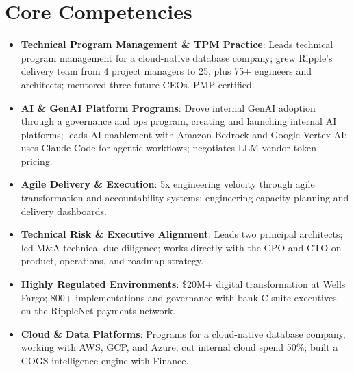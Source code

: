 \documentclass[11pt,letterpaper,sans]{moderncv}
\begin{document}
\section{Core Competencies}
\vspace{1pt}
\begin{itemize}

\item \textbf{Technical Program Management \& TPM Practice}: Leads technical program management for a cloud-native database company; grew Ripple's delivery team from 4 project managers to 25, plus 75+ engineers and architects; mentored three future CEOs. PMP certified.

\item \textbf{AI \& GenAI Platform Programs}: Drove internal GenAI adoption through a governance and ops program, creating and launching internal AI platforms; leads AI enablement with Amazon Bedrock and Google Vertex AI; uses Claude Code for agentic workflows; negotiates LLM vendor token pricing.

\item \textbf{Agile Delivery \& Execution}: 5x engineering velocity through agile transformation and accountability systems; engineering capacity planning and delivery dashboards.

\item \textbf{Technical Risk \& Executive Alignment}: Leads two principal architects; led M\&A technical due diligence; works directly with the CPO and CTO on product, operations, and roadmap strategy.

\item \textbf{Highly Regulated Environments}: \$20M+ digital transformation at Wells Fargo; 800+ implementations and governance with bank C-suite executives on the RippleNet payments network.

\item \textbf{Cloud \& Data Platforms}: Programs for a cloud-native database company, working with AWS, GCP, and Azure; cut internal cloud spend 50\%; built a COGS intelligence engine with Finance.

\end{itemize}

\end{document}
